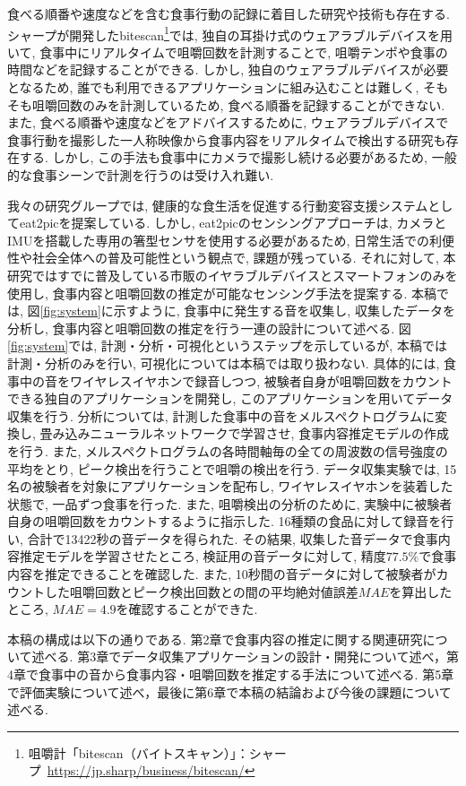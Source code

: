 食べる順番や速度などを含む食事行動の記録に着目した研究や技術も存在する. シャープが開発したbitescan\footnote{咀嚼計「bitescan（バイトスキャン）」：シャープ~\url{https://jp.sharp/business/bitescan/}}では, 独自の耳掛け式のウェアラブルデバイスを用いて, 食事中にリアルタイムで咀嚼回数を計測することで, 咀嚼テンポや食事の時間などを記録することができる. しかし, 独自のウェアラブルデバイスが必要となるため, 誰でも利用できるアプリケーションに組み込むことは難しく, そもそも咀嚼回数のみを計測しているため, 食べる順番を記録することができない. また, 食べる順番や速度などをアドバイスするために, ウェアラブルデバイスで食事行動を撮影した一人称映像から食事内容をリアルタイムで検出する研究も存在する\cite{10.1145/3551626.3564964}. しかし, この手法も食事中にカメラで撮影し続ける必要があるため, 一般的な食事シーンで計測を行うのは受け入れ難い.

我々の研究グループでは, 健康的な食生活を促進する行動変容支援システムとしてeat2picを提案している\cite{10.1145/3580784}. しかし, eat2picのセンシングアプローチは, カメラとIMUを搭載した専用の箸型センサを使用する必要があるため, 日常生活での利便性や社会全体への普及可能性という観点で, 課題が残っている. それに対して, 本研究ではすでに普及している市販のイヤラブルデバイスとスマートフォンのみを使用し, 食事内容と咀嚼回数の推定が可能なセンシング手法を提案する. 本稿では, 図\ref{fig:system}に示すように, 食事中に発生する音を収集し, 収集したデータを分析し, 食事内容と咀嚼回数の推定を行う一連の設計について述べる. 図\ref{fig:system}では, 計測・分析・可視化というステップを示しているが, 本稿では計測・分析のみを行い, 可視化については本稿では取り扱わない. 具体的には, 食事中の音をワイヤレスイヤホンで録音しつつ, 被験者自身が咀嚼回数をカウントできる独自のアプリケーションを開発し, このアプリケーションを用いてデータ収集を行う. 分析については, 計測した食事中の音をメルスペクトログラムに変換し, 畳み込みニューラルネットワークで学習させ, 食事内容推定モデルの作成を行う. また, メルスペクトログラムの各時間軸毎の全ての周波数の信号強度の平均をとり, ピーク検出を行うことで咀嚼の検出を行う. データ収集実験では, 15名の被験者を対象にアプリケーションを配布し, ワイヤレスイヤホンを装着した状態で, 一品ずつ食事を行った. また, 咀嚼検出の分析のために, 実験中に被験者自身の咀嚼回数をカウントするように指示した. 16種類の食品に対して録音を行い, 合計で13422秒の音データを得られた. その結果, 収集した音データで食事内容推定モデルを学習させたところ, 検証用の音データに対して, 精度$77.5\%$で食事内容を推定できることを確認した. また, 10秒間の音データに対して被験者がカウントした咀嚼回数とピーク検出回数との間の平均絶対値誤差$MAE$を算出したところ, $MAE = 4.9$を確認することができた.

本稿の構成は以下の通りである.
第2章で食事内容の推定に関する関連研究について述べる. 第3章でデータ収集アプリケーションの設計・開発について述べ，第4章で食事中の音から食事内容・咀嚼回数を推定する手法について述べる. 第5章で評価実験について述べ，最後に第6章で本稿の結論および今後の課題について述べる.

